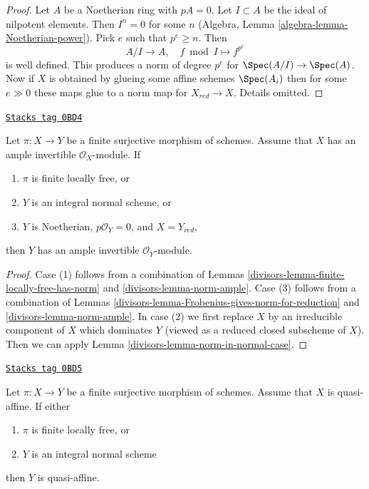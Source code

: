 \begin{proof}
Let $A$ be a Noetherian ring with $pA = 0$. Let $I \subset A$ be the
ideal of nilpotent elements. Then $I^n = 0$ for some $n$ (Algebra,
Lemma \ref{algebra-lemma-Noetherian-power}).
Pick $e$ such that $p^e \geq n$. Then
$$
A/I \longrightarrow A,\quad
f \bmod I \longmapsto f^{p^e}
$$
is well defined. This produces a norm of degree $p^e$ for
$\Spec(A/I) \to \Spec(A)$. Now if $X$ is obtained by glueing some
affine schemes $\Spec(A_i)$ then for some $e \gg 0$ these maps
glue to a norm map for $X_{red} \to X$. Details omitted.
\end{proof}

\begin{proposition}
\label{divisors-proposition-push-down-ample}
\href{https://stacks.math.columbia.edu/tag/0BD4}{\texttt{Stacks tag 0BD4}}

Let $\pi : X \to Y$ be a finite surjective morphism of schemes.
Assume that $X$ has an ample invertible $\mathcal{O}_X$-module. If
\begin{enumerate}
\item $\pi$ is finite locally free, or
\item $Y$ is an integral normal scheme, or
\item $Y$ is Noetherian, $p\mathcal{O}_Y = 0$, and $X = Y_{red}$,
\end{enumerate}
then $Y$ has an ample invertible $\mathcal{O}_Y$-module.
\end{proposition}

\begin{proof}

Case (1) follows from a combination of
Lemmas \ref{divisors-lemma-finite-locally-free-has-norm} and \ref{divisors-lemma-norm-ample}.
Case (3) follows from a combination of
Lemmas \ref{divisors-lemma-Frobenius-gives-norm-for-reduction} and
\ref{divisors-lemma-norm-ample}.
In case (2) we first replace $X$ by an irreducible component of $X$
which dominates $Y$ (viewed as a reduced closed subscheme of $X$).
Then we can apply Lemma \ref{divisors-lemma-norm-in-normal-case}.
\end{proof}

\begin{lemma}
\label{divisors-lemma-push-down-quasi-affine}
\href{https://stacks.math.columbia.edu/tag/0BD5}{\texttt{Stacks tag 0BD5}}

Let $\pi : X \to Y$ be a finite surjective morphism of schemes.
Assume that $X$ is quasi-affine. If either
\begin{enumerate}
\item $\pi$ is finite locally free, or
\item $Y$ is an integral normal scheme
\end{enumerate}
then $Y$ is quasi-affine.
\end{lemma}

